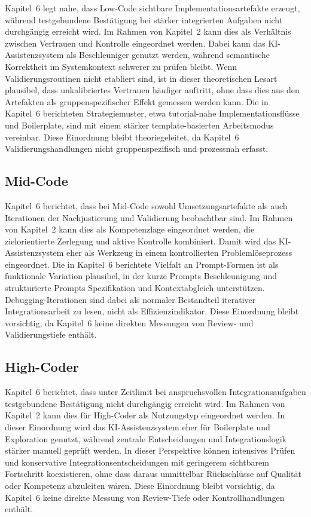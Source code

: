 Kapitel~6 legt nahe, dass Low-Code sichtbare Implementationsartefakte erzeugt, während testgebundene Bestätigung bei stärker integrierten Aufgaben nicht durchgängig erreicht wird.
Im Rahmen von Kapitel~2 kann dies als Verhältnis zwischen Vertrauen und Kontrolle eingeordnet werden.
Dabei kann das KI-Assistenzsystem als Beschleuniger genutzt werden, während semantische Korrektheit im Systemkontext schwerer zu prüfen bleibt.
Wenn Validierungsroutinen nicht etabliert sind, ist in dieser theoretischen Lesart plausibel, dass unkalibriertes Vertrauen häufiger auftritt, ohne dass dies aus den Artefakten als gruppenspezifischer Effekt gemessen werden kann.
Die in Kapitel~6 berichteten Strategiemuster, etwa tutorial-nahe Implementationsflüsse und Boilerplate, sind mit einem stärker template-basierten Arbeitsmodus vereinbar.
Diese Einordnung bleibt theoriegeleitet, da Kapitel~6 Validierungshandlungen nicht gruppenspezifisch und prozessnah erfasst.

\subsection{Mid-Code}
\label{sec:discussion_mid_code}

Kapitel~6 berichtet, dass bei Mid-Code sowohl Umsetzungsartefakte als auch Iterationen der Nachjustierung und Validierung beobachtbar sind.
Im Rahmen von Kapitel~2 kann dies als Kompetenzlage eingeordnet werden, die zielorientierte Zerlegung und aktive Kontrolle kombiniert.
Damit wird das KI-Assistenzsystem eher als Werkzeug in einem kontrollierten Problemlöseprozess eingeordnet.
Die in Kapitel~6 berichtete Vielfalt an Prompt-Formen ist als funktionale Variation plausibel, in der kurze Prompts Beschleunigung und strukturierte Prompts Spezifikation und Kontextabgleich unterstützen.
Debugging-Iterationen sind dabei als normaler Bestandteil iterativer Integrationsarbeit zu lesen, nicht als Effizienzindikator.
Diese Einordnung bleibt vorsichtig, da Kapitel~6 keine direkten Messungen von Review- und Validierungstiefe enthält.

\subsection{High-Coder}
\label{sec:discussion_high_code}

Kapitel~6 berichtet, dass unter Zeitlimit bei anspruchsvollen Integrationsaufgaben testgebundene Bestätigung nicht durchgängig erreicht wird.
Im Rahmen von Kapitel~2 kann dies für High-Coder als Nutzungstyp eingeordnet werden.
In dieser Einordnung wird das KI-Assistenzsystem eher für Boilerplate und Exploration genutzt, während zentrale Entscheidungen und Integrationslogik stärker manuell geprüft werden.
In dieser Perspektive können intensives Prüfen und konservative Integrationsentscheidungen mit geringerem sichtbarem Fortschritt koexistieren, ohne dass daraus unmittelbar Rückschlüsse auf Qualität oder Kompetenz abzuleiten wären.
Diese Einordnung bleibt vorsichtig, da Kapitel~6 keine direkte Messung von Review-Tiefe oder Kontrollhandlungen enthält.


